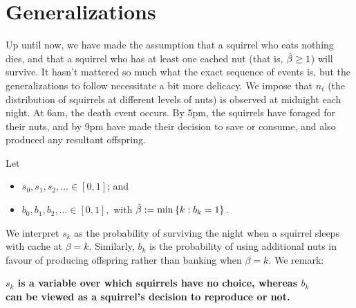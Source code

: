 \section{Generalizations}
Up until now, we have made the assumption that a squirrel who
eats nothing dies, and that a squirrel who has at least one cached nut
(that is, $\hat{\beta} \ge 1$) will survive. It hasn't mattered so much what
the exact sequence of events is, but the generalizations to follow necessitate a bit
more delicacy. We impose that $n_t$ (the distribution of squirrels at different
levels of nuts) is observed at midnight each night. At 6am, the death event occurs. By
5pm, the squirrels have foraged for their nuts, and by 9pm have made their decision to
save or consume, and also produced any resultant offspring. 
 \\

\begin{center}
\end{center}

Let
\begin{itemize}
    \item $s_0, s_1, s_2, \ldots \in [0, 1]$; and
    \item $b_0, b_1, b_2, \ldots \in \left[ 0, 1 \right],$ with $\hat{\beta} := \min\left\{ k : b_k = 1 \right\}$. 
\end{itemize}
We interpret $s_k$ as the probability of surviving the night when a squirrel sleeps with cache
at $\beta = k$. Similarly, $b_k$ is the probability of using additional nuts in favour of producing
offspring rather than banking when $\beta = k$. We remark:
\begin{center}
    \textbf{$s_k$ is a variable over which squirrels have no choice, whereas $b_k$ \\
        can be viewed as a squirrel's decision to reproduce or not.}
\end{center}



